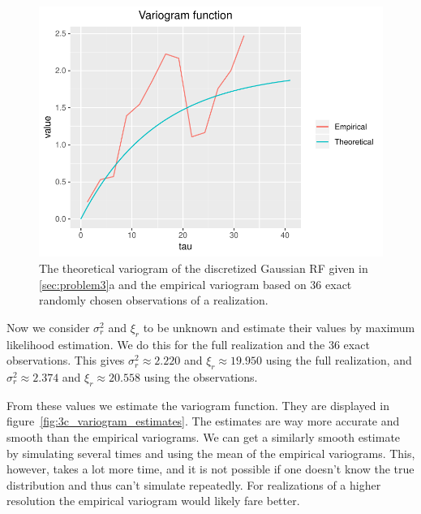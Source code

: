 \begin{figure}
    \centering
    \includegraphics[scale=0.95]{figures/3c_variogram_obs.pdf}
    \caption{The theoretical variogram of the discretized Gaussian RF given in \ref{sec:problem3}a and the empirical variogram based on 36 exact randomly chosen observations of a realization.}
    \label{fig:3c_variogram_obs}
\end{figure}

Now we consider $\sigma_r^2$ and $\xi_r$ to be unknown and estimate their values by maximum likelihood estimation. We do this for the full realization and the 36 exact observations. This gives $\sigma_r^2 \approx 2.220$ and $\xi_r \approx 19.950$ using the full realization, and $\sigma_r^2 \approx 2.374$ and $\xi_r \approx 20.558$ using the observations. 

From these values we estimate the variogram function. They are displayed in figure~\ref{fig:3c_variogram_estimates}. The estimates are way more accurate and smooth than the empirical variograms. We can get a similarly smooth estimate by simulating several times and using the mean of the empirical variograms. This, however, takes a lot more time, and it is not possible if one doesn't know the true distribution and thus can't simulate repeatedly. For realizations of a higher resolution the empirical variogram would likely fare better.

